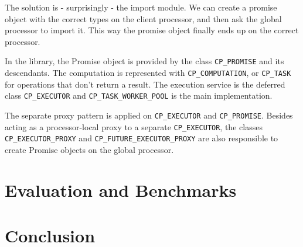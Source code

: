 \documentclass[a4paper,10pt]{report}
\begin{document}
The solution is - surprisingly - the import module.
We can create a promise object with the correct types on the client processor, and then ask the global processor to import it.
This way the promise object finally ends up on the correct processor.

In the library, the Promise object is provided by the class \lstinline!CP_PROMISE! and its descendants.
The computation is represented with \lstinline!CP_COMPUTATION!, or \lstinline!CP_TASK! for operations that don't return a result.
The execution service is the deferred class \lstinline!CP_EXECUTOR! and \lstinline!CP_TASK_WORKER_POOL! is the main implementation.

The separate proxy pattern is applied on \lstinline!CP_EXECUTOR! and \lstinline!CP_PROMISE!.
Besides acting as a processor-local proxy to a separate \lstinline!CP_EXECUTOR!, 
the classes \lstinline!CP_EXECUTOR_PROXY! and \lstinline!CP_FUTURE_EXECUTOR_PROXY! are also responsible to create Promise objects on the global processor.

\section{Evaluation and Benchmarks}


%

\section{Conclusion}

\begin{appendix}
%
\end{appendix}

\todos
\end{document}
